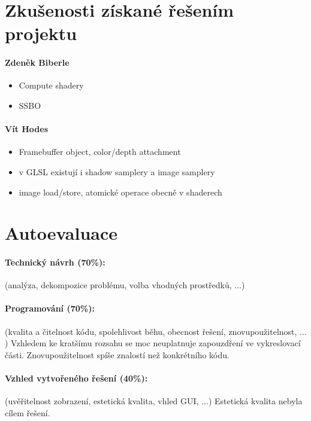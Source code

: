 \documentclass[11pt,a4paper]{article}
\begin{document}
\section{Zkušenosti získané řešením projektu}

\paragraph{Zdeněk Biberle}
\begin{itemize}
	\item Compute shadery
	\item SSBO
\end{itemize}

\paragraph{Vít Hodes}
\begin{itemize}
	\item Framebuffer object, color/depth attachment
	\item v GLSL existují i shadow samplery a image samplery
	\item image load/store, atomické operace obecně v shaderech
	
\end{itemize}

\section{Autoevaluace}

\paragraph{Technický návrh (70\%):} (analýza, dekompozice problému, volba
vhodných prostředků, $\ldots$) 


\paragraph{Programování (70\%):} (kvalita a čitelnost kódu, spolehlivost běhu,
obecnost řešení, znovupoužitelnost, $\ldots$)
Vzhledem ke kratšímu rozsahu se moc neuplatnuje zapouzdření ve vykreslovací části. Znovupoužitelnost
spíše znalostí než konkrétního kódu.

\paragraph{Vzhled vytvořeného řešení (40\%):} (uvěřitelnost zobrazení,
estetická kvalita, vhled GUI, $\ldots$)
Estetická kvalita nebyla cílem řešení.
\end{document}
